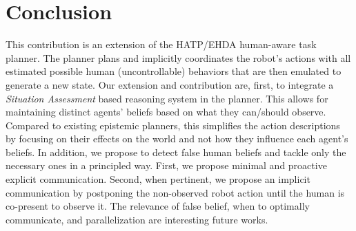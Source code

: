 \section{Conclusion}

This contribution is an extension of the HATP/EHDA human-aware task planner. 
The planner plans and implicitly coordinates the robot's actions with all estimated possible human (uncontrollable) behaviors that are then emulated to generate a new state.
Our extension and contribution are, first, to integrate a \textit{Situation Assessment} based reasoning system in the planner. This allows for maintaining distinct agents' beliefs based on what they can/should observe.
Compared to existing epistemic planners, this simplifies the action descriptions by focusing on their effects on the world and not how they influence each agent's beliefs.
In addition, we propose to detect false human beliefs and tackle only the necessary ones in a principled way. First, we propose minimal and proactive explicit communication. Second, when pertinent, 
we propose an implicit communication by postponing the non-observed robot action until the human is co-present to observe it.  
The relevance of false belief, when to optimally communicate, and parallelization are interesting future works.